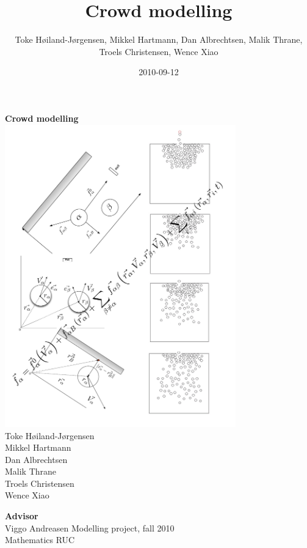 \documentclass[a4paper,11pt]{scrartcl}
\title{Crowd modelling}
\author{Toke Høiland-Jørgensen, Mikkel Hartmann, Dan Albrechtsen, Malik 
Thrane, Troels Christensen, Wence Xiao}
\date{2010-09-12}
\begin{document}
\begin{titlepage}
    \begin{center}
        {\Huge \sffamily \textbf{Crowd modelling\\[2cm]
        }}\includegraphics[width=10cm]{Figures/Frontpage}
        \\[2cm]

        {\large Toke Høiland-Jørgensen \\
        Mikkel Hartmann\\
        Dan Albrechtsen\\
        Malik Thrane\\
        Troels Christensen\\
        Wence Xiao\\
        [0.5cm] }

        {\small \textbf{\textsf{Advisor}}\\
        Viggo Andreasen}
        \vfill
        \textsf{Modelling project, fall 2010\\
        Mathematics RUC}
	\end{center}

    \clearpage
%    
\end{titlepage}

\tableofcontents
\listoffigures

\clearpage


\clearpage

\clearpage

\clearpage

\clearpage

\clearpage

\clearpage

\clearpage

\clearpage

\clearpage


\clearpage
\end{document}

